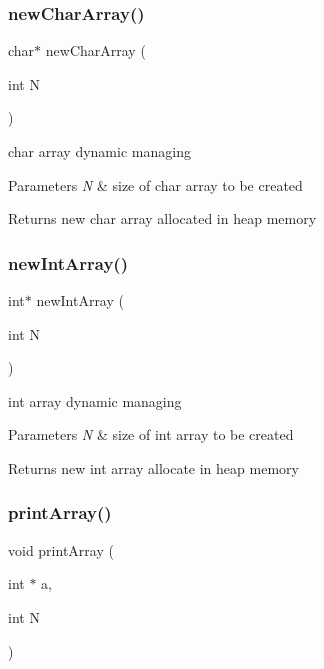 \label{lib__util_8c_a5464788ff0b0aa7d80b59c71b491fd64} 
\subsubsection{new\+Char\+Array()}
{\footnotesize\ttfamily char$\ast$ new\+Char\+Array (\begin{DoxyParamCaption}\item[{int}]{N }\end{DoxyParamCaption})}



char array dynamic managing 


\begin{DoxyParams}{Parameters}
{\em N} & size of char array to be created\\
\hline
\end{DoxyParams}
\begin{DoxyReturn}{Returns}
new char array allocated in heap memory 
\end{DoxyReturn}
\label{lib__util_8c_a5ba3cf6fcab01d08810c6f218aff3eff} 
\subsubsection{new\+Int\+Array()}
{\footnotesize\ttfamily int$\ast$ new\+Int\+Array (\begin{DoxyParamCaption}\item[{int}]{N }\end{DoxyParamCaption})}



int array dynamic managing 


\begin{DoxyParams}{Parameters}
{\em N} & size of int array to be created\\
\hline
\end{DoxyParams}
\begin{DoxyReturn}{Returns}
new int array allocate in heap memory 
\end{DoxyReturn}
\label{lib__util_8c_a111139000f3b4b6c6279a767613bd1ea} 
\subsubsection{print\+Array()}
{\footnotesize\ttfamily void print\+Array (\begin{DoxyParamCaption}\item[{int $\ast$}]{a,  }\item[{int}]{N }\end{DoxyParamCaption})}

